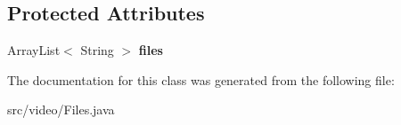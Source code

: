\subsection*{Protected Attributes}
\begin{DoxyCompactItemize}
\item 
\hypertarget{classvideo_1_1_files_a6440cd70022db04f99c35c732e96177f}{
ArrayList$<$ String $>$ {\bfseries files}}
\label{classvideo_1_1_files_a6440cd70022db04f99c35c732e96177f}

\end{DoxyCompactItemize}


The documentation for this class was generated from the following file:\begin{DoxyCompactItemize}
\item 
src/video/Files.java\end{DoxyCompactItemize}
